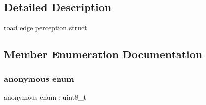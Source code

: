 \subsection{Detailed Description}
road edge perception struct 

\subsection{Member Enumeration Documentation}
\mbox{\label{structmaf__perception__interface_1_1RoadEdgePerception_aa1ba5457da40c90d05be4d21f3641b4b}} 
\subsubsection{\texorpdfstring{anonymous enum}{anonymous enum}}
{\footnotesize\ttfamily anonymous enum \+: uint8\+\_\+t}

